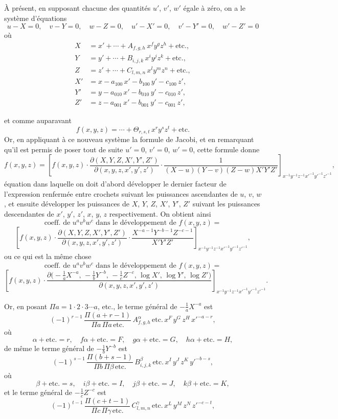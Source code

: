 \documentclass[11pt,a4paper]{article}
\begin{document}
\`A pr\'esent, en supposant chacune des quantit\'es $u'$, $v'$, $w'$ \'egale \`a
z\'ero, on a le syst\`eme d'\'equations
\[
u-X=0, \quad v-Y=0, \quad w-Z=0, \quad u'-X'=0, \quad v'-Y'=0, \quad w'-Z'=0
\]
o\`u
\begin{align*}
X &= x' + \cdots + A_{f,g,h}\,x^f y^g z^h + \text{etc.}, \\
Y &= y' + \cdots + B_{i,j,k}\,x^i y^j z^k + \text{etc.}, \\
Z &= z' + \cdots + C_{l,m,n}\,x^l y^m z^n + \text{etc.}, \\
X' &= x - a_{100}\,x' - b_{100}\,y' - c_{100}\,z', \\
Y' &= y - a_{010}\,x' - b_{010}\,y' - c_{010}\,z', \\
Z' &= z - a_{001}\,x' - b_{001}\,y' - c_{001}\,z',
\end{align*}

\setcounter{page}{56}

et comme auparavant
\[
f(x,y,z) = \cdots + \Theta_{r,s,t}\,x^r y^s z^t + \text{etc.}
\]
Or, en appliquant \`a ce nouveau syst\`eme la formule de Jacobi, et en remarquant
qu'il est permis de poser tout de suite $u'=0$, $v'=0$, $w'=0$, cette formule donne
\[
f(x,y,z) =
\left[ f(x,y,z) \cdot \frac{\partial(X,Y,Z,X',Y',Z')}{\partial(x,y,z,x',y',z')}
\cdot \frac{1}{(X-u)(Y-v)(Z-w)X'Y'Z'} \right]_{x^{-1}y^{-1}z^{-1}x'^{-1}y'^{-1}z'^{-1}},
\]
\'equation dans laquelle on doit d'abord d\'evelopper le dernier facteur de
l'expression renferm\'ee entre crochets suivant les puissances ascendantes de
$u$, $v$, $w$, et ensuite d\'evelopper les puissances de $X$, $Y$, $Z$, $X'$, $Y'$, $Z'$
suivant les puissances descendantes de $x'$, $y'$, $z'$, $x$, $y$, $z$
respectivement. On obtient ainsi
\[
\text{coeff.\ de } u^a v^b w^c \text{ dans le d\'eveloppement de } f(x,y,z) =
\]
\[
\left[ f(x,y,z) \cdot \frac{\partial(X,Y,Z,X',Y',Z')}{\partial(x,y,z,x',y',z')}
\cdot \frac{X^{-a-1} Y^{-b-1} Z^{-c-1}}{X'Y'Z'} \right]_{x^{-1}y^{-1}z^{-1}x'^{-1}y'^{-1}z'^{-1}},
\]
ou ce qui est la m\^eme chose
\[
\text{coeff.\ de } u^a v^b w^c \text{ dans le d\'eveloppement de } f(x,y,z) =
\]
\[
\left[ f(x,y,z) \cdot \frac{\partial \big(-\tfrac{1}{a}X^{-a},\,-\tfrac{1}{b}Y^{-b},\,-\tfrac{1}{c}Z^{-c},\,\log X',\,\log Y',\,\log Z'\big)}{\partial(x,y,z,x',y',z')} \right]_{x^{-1}y^{-1}z^{-1}x'^{-1}y'^{-1}z'^{-1}}.
\]

Or, en posant $\Pi a = 1\cdot 2\cdot 3 \cdots a$, etc., le terme g\'en\'eral de
$-\tfrac{1}{a}X^{-a}$ est
\[
(-1)^{r-1}\,\frac{\Pi(a+r-1)}{\Pi a\,\Pi a\,\text{etc.}}\,A_{f,g,h}^{\alpha}\,\text{etc.}\,x^{F}\,y^{G}\,z^{H}\,x'^{-a-r},
\]
o\`u
\[
\alpha + \text{etc.} = r,\quad f\alpha + \text{etc.} = F,\quad g\alpha + \text{etc.} = G,\quad h\alpha + \text{etc.} = H,
\]
de m\^eme le terme g\'en\'eral de $-\tfrac{1}{b}Y^{-b}$ est
\[
(-1)^{s-1}\,\frac{\Pi(b+s-1)}{\Pi b\,\Pi\beta\,\text{etc.}}\,B_{i,j,k}^{\beta}\,\text{etc.}\,x^{I}\,y^{J}\,z^{K}\,y'^{-b-s},
\]
o\`u
\[
\beta + \text{etc.} = s,\quad i\beta + \text{etc.} = I,\quad j\beta + \text{etc.} = J,\quad k\beta + \text{etc.} = K,
\]
et le terme g\'en\'eral de $-\tfrac{1}{c}Z^{-c}$ est
\[
(-1)^{t-1}\,\frac{\Pi(c+t-1)}{\Pi c\,\Pi\gamma\,\text{etc.}}\,C_{l,m,n}^{\gamma}\,\text{etc.}\,x^{L}\,y^{M}\,z^{N}\,z'^{-c-t},
\]
\end{document}
